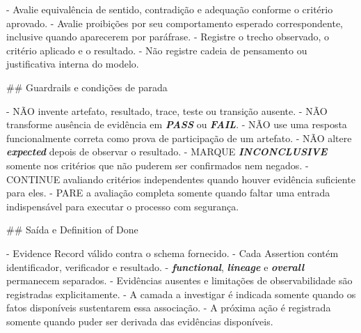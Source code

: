\documentclass[
  10pt,
  a4paper,
  oneside]{book}
\newenvironment{Shaded}{}{}
\newcommand{\FunctionTok}[1]{\textcolor[rgb]{0.02,0.16,0.49}{#1}}
\newcommand{\InformationTok}[1]{\textcolor[rgb]{0.38,0.63,0.69}{\textbf{\textit{#1}}}}
\newcommand{\NormalTok}[1]{#1}
\newcommand{\SpecialStringTok}[1]{\textcolor[rgb]{0.73,0.40,0.53}{#1}}
\renewenvironment{Shaded}{\begin{snugshade}}{\end{snugshade}}%
\begin{document}
\begin{Shaded}
\begin{Highlighting}[]
\SpecialStringTok{{-} }\NormalTok{Avalie equivalência de sentido, contradição e adequação conforme o critério aprovado.}
\SpecialStringTok{{-} }\NormalTok{Avalie proibições por seu comportamento esperado correspondente, inclusive quando aparecerem por paráfrase.}
\SpecialStringTok{{-} }\NormalTok{Registre o trecho observado, o critério aplicado e o resultado.}
\SpecialStringTok{{-} }\NormalTok{Não registre cadeia de pensamento ou justificativa interna do modelo.}

\FunctionTok{\#\# Guardrails e condições de parada}

\SpecialStringTok{{-} }\NormalTok{NÃO invente artefato, resultado, trace, teste ou transição ausente.}
\SpecialStringTok{{-} }\NormalTok{NÃO transforme ausência de evidência em }\InformationTok{\textasciigrave{}PASS\textasciigrave{}}\NormalTok{ ou }\InformationTok{\textasciigrave{}FAIL\textasciigrave{}}\NormalTok{.}
\SpecialStringTok{{-} }\NormalTok{NÃO use uma resposta funcionalmente correta como prova de participação de um artefato.}
\SpecialStringTok{{-} }\NormalTok{NÃO altere }\InformationTok{\textasciigrave{}expected\textasciigrave{}}\NormalTok{ depois de observar o resultado.}
\SpecialStringTok{{-} }\NormalTok{MARQUE }\InformationTok{\textasciigrave{}INCONCLUSIVE\textasciigrave{}}\NormalTok{ somente nos critérios que não puderem ser confirmados nem negados.}
\SpecialStringTok{{-} }\NormalTok{CONTINUE avaliando critérios independentes quando houver evidência suficiente para eles.}
\SpecialStringTok{{-} }\NormalTok{PARE a avaliação completa somente quando faltar uma entrada indispensável para executar o processo com segurança.}

\FunctionTok{\#\# Saída e Definition of Done}

\SpecialStringTok{{-} }\NormalTok{Evidence Record válido contra o schema fornecido.}
\SpecialStringTok{{-} }\NormalTok{Cada Assertion contém identificador, verificador e resultado.}
\SpecialStringTok{{-} }\InformationTok{\textasciigrave{}functional\textasciigrave{}}\NormalTok{, }\InformationTok{\textasciigrave{}lineage\textasciigrave{}}\NormalTok{ e }\InformationTok{\textasciigrave{}overall\textasciigrave{}}\NormalTok{ permanecem separados.}
\SpecialStringTok{{-} }\NormalTok{Evidências ausentes e limitações de observabilidade são registradas explicitamente.}
\SpecialStringTok{{-} }\NormalTok{A camada a investigar é indicada somente quando os fatos disponíveis sustentarem essa associação.}
\SpecialStringTok{{-} }\NormalTok{A próxima ação é registrada somente quando puder ser derivada das evidências disponíveis.}


\end{Highlighting}
\end{Shaded}
\end{document}
